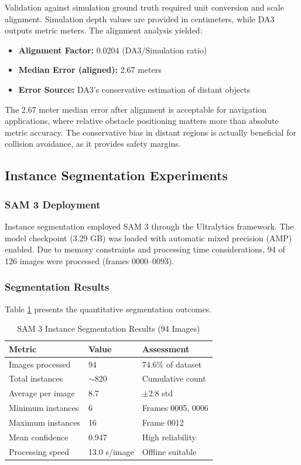 Validation against simulation ground truth required unit conversion and scale alignment. Simulation depth values are provided in centimeters, while DA3 outputs metric meters. The alignment analysis yielded:

\begin{itemize}
    \item \textbf{Alignment Factor:} 0.0204 (DA3/Simulation ratio)
    \item \textbf{Median Error (aligned):} 2.67 meters
    \item \textbf{Error Source:} DA3's conservative estimation of distant objects
\end{itemize}

The 2.67 meter median error after alignment is acceptable for navigation applications, where relative obstacle positioning matters more than absolute metric accuracy. The conservative bias in distant regions is actually beneficial for collision avoidance, as it provides safety margins.

\subsection{Instance Segmentation Experiments}

\subsubsection{SAM 3 Deployment}

Instance segmentation employed SAM 3 through the Ultralytics framework. The model checkpoint (3.29 GB) was loaded with automatic mixed precision (AMP) enabled. Due to memory constraints and processing time considerations, 94 of 126 images were processed (frames 0000--0093).

\subsubsection{Segmentation Results}

Table \ref{tab:sam3_results} presents the quantitative segmentation outcomes.

\begin{table}[htbp]
\centering
\caption{SAM 3 Instance Segmentation Results (94 Images)}
\label{tab:sam3_results}
\begin{tabular}{@{}lll@{}}
\toprule
\textbf{Metric} & \textbf{Value} & \textbf{Assessment} \\
\midrule
Images processed & 94 & 74.6\% of dataset \\
Total instances & $\sim$820 & Cumulative count \\
Average per image & 8.7 & $\pm$2.8 std \\
Minimum instances & 6 & Frames 0005, 0006 \\
Maximum instances & 16 & Frame 0012 \\
Mean confidence & 0.947 & High reliability \\
Processing speed & 13.0 s/image & Offline suitable \\
\bottomrule
\end{tabular}
\end{table}

